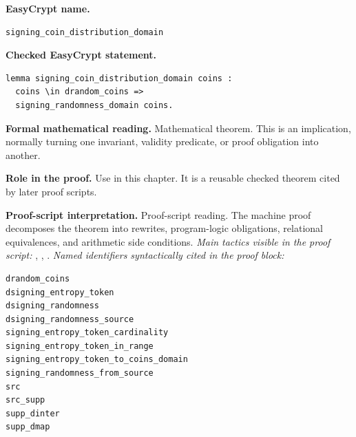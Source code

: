 \begin{formaltheorem}
\noindent\textbf{EasyCrypt name.}
\begin{lstlisting}[language=EasyCrypt,basicstyle=\ttfamily\scriptsize]
signing_coin_distribution_domain
\end{lstlisting}
\noindent\textbf{Checked EasyCrypt statement.}
\begin{lstlisting}[language=EasyCrypt,basicstyle=\ttfamily\scriptsize]
lemma signing_coin_distribution_domain coins :
  coins \in drandom_coins =>
  signing_randomness_domain coins.
\end{lstlisting}
\noindent\textbf{Formal mathematical reading.}
Mathematical theorem. This is an implication, normally turning one invariant, validity predicate, or proof obligation into another.

\noindent\textbf{Role in the proof.}
Use in this chapter. It is a reusable checked theorem cited by later proof scripts.

\noindent\textbf{Proof-script interpretation.}
Proof-script reading. The machine proof decomposes the theorem into rewrites, program-logic obligations, relational equivalences, and arithmetic side conditions.
\emph{Main tactics visible in the proof script:} , , .
\emph{Named identifiers syntactically cited in the proof block:}
\begin{lstlisting}[language=EasyCrypt,basicstyle=\ttfamily\scriptsize]
drandom_coins
dsigning_entropy_token
dsigning_randomness
dsigning_randomness_source
signing_entropy_token_cardinality
signing_entropy_token_in_range
signing_entropy_token_to_coins_domain
signing_randomness_from_source
src
src_supp
supp_dinter
supp_dmap
\end{lstlisting}

\end{formaltheorem}

